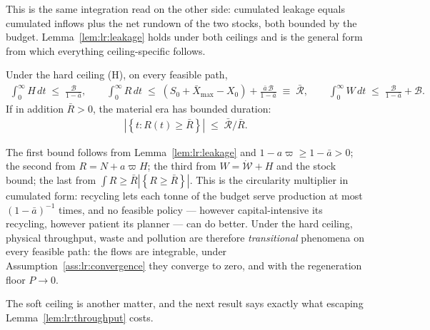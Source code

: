 This is the same integration read on the other side: cumulated leakage equals cumulated inflows plus the net rundown of the two stocks, both bounded by the budget. Lemma~\ref{lem:lr:leakage} holds under both ceilings and is the general form from which everything ceiling-specific follows.

\begin{lemma}\label{lem:lr:throughput}
Under the hard ceiling (H), on every feasible path,
\begin{align}
\int_0^\infty H\,dt \;\le\; \frac{\mathcal B}{1-\bar a},
\qquad
\int_0^\infty R\,dt \;\le\; \left(S_0+\bar X_{\max}-X_0\right)+\frac{\bar a\,\mathcal B}{1-\bar a}
\;\equiv\;\bar{\mathcal R},
\qquad
\int_0^\infty W\,dt \;\le\; \frac{\mathcal B}{1-\bar a}+\mathcal B .
\label{eq:sp:lr:throughput}
\end{align}
If in addition $\bar R>0$, the material era has bounded duration:
\begin{align}
\left|\left\{t:R\left(t\right)\ge\bar R\right\}\right| \;\le\; \bar{\mathcal R}/\bar R .
\label{eq:sp:lr:duration}
\end{align}
\end{lemma}

The first bound follows from Lemma~\ref{lem:lr:leakage} and $1-a\varpi\ge1-\bar a>0$; the second from $R=N+a\varpi H$; the third from $W=\dot{\mathcal W}+H$ and the stock bound; the last from $\int R\ge\bar R\left|\left\{R\ge\bar R\right\}\right|$. This is the circularity multiplier in cumulated form: recycling lets each tonne of the budget serve production at most $\left(1-\bar a\right)^{-1}$ times, and no feasible policy --- however capital-intensive its recycling, however patient its planner --- can do better. Under the hard ceiling, physical throughput, waste and pollution are therefore \emph{transitional} phenomena on every feasible path: the flows are integrable, under Assumption~\ref{ass:lr:convergence} they converge to zero, and with the regeneration floor $P\to0$.

The soft ceiling is another matter, and the next result says exactly what escaping Lemma~\ref{lem:lr:throughput} costs.

